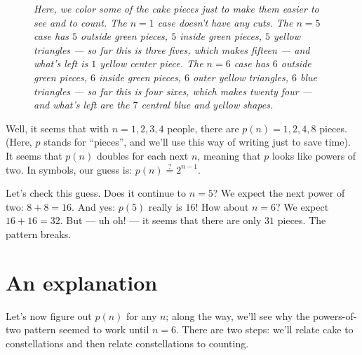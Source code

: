 \documentclass[openany, notitlepage, justified]{tufte-book}
\begin{document}
\begin{figure}[h!]
                \caption{\emph{
                    Here, we color some of the cake pieces just to make them
                    easier to see and to count.
                    The $n=1$ case doesn't have any cuts.
                    The $n=5$ case has $5$ outside green pieces, $5$ inside
                    green pieces, $5$ yellow triangles --- so far this is three
                    fives, which makes fifteen --- and what's left is $1$
                    yellow center piece.
                    The $n=6$ case has $6$ outside green pieces, $6$ inside
                    green pieces, $6$ outer yellow triangles, $6$ blue
                    triangles --- so far this is four sixes, which makes twenty
                    four --- and what's left are the $7$ central blue and
                    yellow shapes.
                }}
            \end{figure}

            Well, it seems that with $n=1, 2, 3, 4$ people, there are $p(n) =
            1, 2, 4, 8$ pieces.  (Here, $p$ stands for ``pieces'', and we'll
            use this way of writing just to save time).  It seems that $p(n)$
            doubles for each next $n$, meaning that $p$ looks like powers of
            two.  In symbols, our guess is: $p(n) \stackrel{?}{=} 2^{n-1}$.

            Let's check this guess.  Does it continue to $n=5$?  We expect the
            next power of two: $8+8=16$.  And yes: $p(5)$ really is
            $16$!  How about $n=6$?  We expect $16+16=32$.  But --- uh oh! ---
            it seems that there are only $31$ pieces.  The pattern breaks.

        \section{An explanation}
            Let's now figure out $p(n)$ for any $n$; along the way, we'll see
            why the powers-of-two pattern seemed to work until $n=6$.
            There are two steps: we'll relate cake to constellations
            and then relate constellations to counting.
\end{document}

